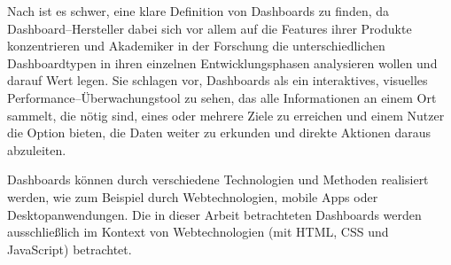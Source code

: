 Nach \autocite[S. 44]{Yigitbasioglu.AReviewOfDashboardsInPerformanceManagement.2012} ist es schwer, eine klare Definition von Dashboards zu finden, da Dashboard--Hersteller dabei sich vor allem auf die Features ihrer Produkte konzentrieren und Akademiker in der Forschung die unterschiedlichen Dashboardtypen in ihren einzelnen Entwicklungsphasen analysieren wollen und darauf Wert legen.
Sie schlagen vor, Dashboards als ein interaktives, visuelles Performance--Überwachungstool zu sehen, das alle Informationen an einem Ort sammelt, die nötig sind, eines oder mehrere Ziele zu erreichen und einem Nutzer die Option bieten, die Daten weiter zu erkunden und direkte Aktionen daraus abzuleiten.

Dashboards können durch verschiedene Technologien und Methoden realisiert werden, wie zum Beispiel durch Webtechnologien, mobile Apps oder Desktopanwendungen.
Die in dieser Arbeit betrachteten Dashboards werden ausschließlich im Kontext von Webtechnologien (mit \ac{HTML}, \ac{CSS} und JavaScript) betrachtet.


